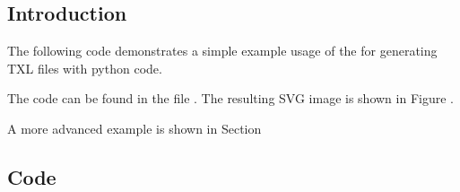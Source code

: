 \documentclass[letterpaper,10pt,english]{sphinxmanual}
\begin{document}
\subsection{Introduction}
\label{Chapters/20_Examples:id1}
The following code demonstrates a simple example usage of the  for
generating TXL files with python code.

The code can be found in the file .
The resulting SVG image is shown in Figure {\hyperref[Chapters/20_Examples:examplesimplesvg]{}}.

A more advanced example is shown in Section {\hyperref[Chapters/20_Examples:txlwizardexampleadvanced]{}}


\subsection{Code}
\label{Chapters/20_Examples:id2}
\end{document}
